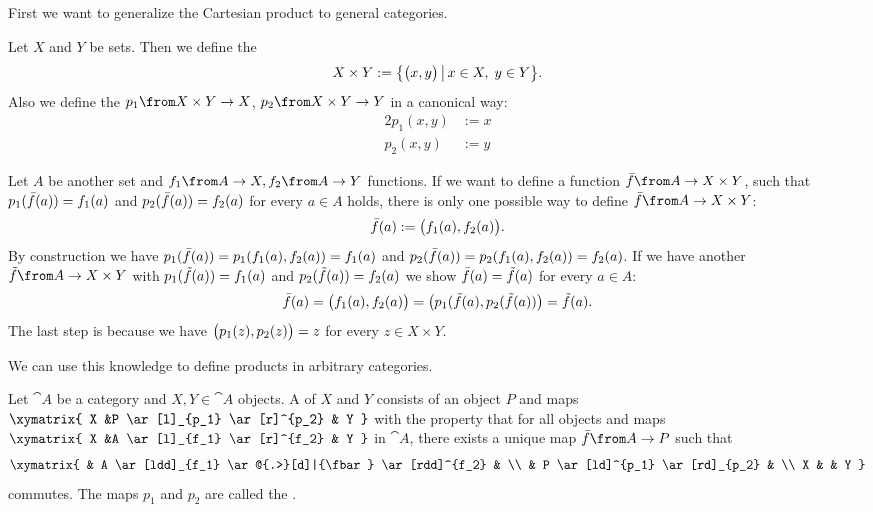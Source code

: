 First we want to generalize the Cartesian product to general categories.

\begin{example}
  \label{ex:prod:cart}
  Let $X$ and $Y$ be sets.
  Then we define the 
  $$X \times Y := \bigl \{ \bigl( x , y \bigr) \,\big|\, x \in X, \; y \in Y \bigr \}.$$
  Also we define the  $p_1 \from X \times Y \to X$, $p_2 \from X \times Y \to Y$ in a canonical way:
  \begin{alignat*}{2}
    p_1(x,y) &:= x \\
    p_2(x,y) &:= y
  \end{alignat*}

  Let $A$ be another set and $f_1 \from A \to X, f_2 \from A \to Y$ functions.
  If we want to define a function $\fbar \from A \to X \times Y$, such that
  $p_1(\bar{f}(a)) = f_1(a)$ and $p_2(\bar{f}(a)) = f_2(a)$ for every $a \in A$ holds,
  there is only one possible way to define $\fbar \from A \to X \times Y$:
  $$\bar{f}(a) := \bigl( f_1(a) , f_2(a) \bigr).$$
  By construction we have $p_1(\bar{f}(a)) = p_1(f_1(a), f_2(a)) = f_1(a)$ and $p_2(\bar{f}(a)) = p_2(f_1(a), f_2(a)) = f_2(a)$.
  If we have another $\ftilde \from A \to X \times Y$ with $p_1(\tilde{f}(a)) = f_1(a)$ and $p_2(\tilde{f}(a)) = f_2(a)$ we show $\bar{f}(a) = \tilde{f}(a)$ for every $a \in A$:
  $$\bar{f}(a) = \bigl( f_1(a) , f_2(a) \bigr) = \bigl( p_1(\tilde{f}(a) , p_2(\tilde{f}(a)) \bigr) = \tilde{f}(a).$$
  The last step is because we have $\bigl( p_1(z) , p_2(z) \bigr) = z$ for every $z \in X \times Y$.
\end{example}

We can use this knowledge to define products in arbitrary categories.

\begin{definition}[Product]
  \label{def:prod}
  Let $\cat{A}$ be a category and $X, Y \in \cat{A}$ objects.
  A  of $X$ and $Y$ consists of an object $P$ and maps
  $ \xymatrix{
    X &P \ar[l]_{p_1} \ar[r]^{p_2} & Y
  } $
  with the property that for all objects and maps
  $ \xymatrix{
    X &A \ar[l]_{f_1} \ar[r]^{f_2} & Y
  } $
  in $\cat{A}$, there exists a unique map $\fbar\from A \to P$ such that
  \[ \xymatrix{
    & A \ar[ldd]_{f_1} \ar@{.>}[d]|{\fbar} \ar[rdd]^{f_2} & \\
    & P \ar[ld]^{p_1} \ar[rd]_{p_2} & \\
    X & & Y
  } \]
  commutes. The maps $p_1$ and $p_2$ are called the .
\end{definition}

